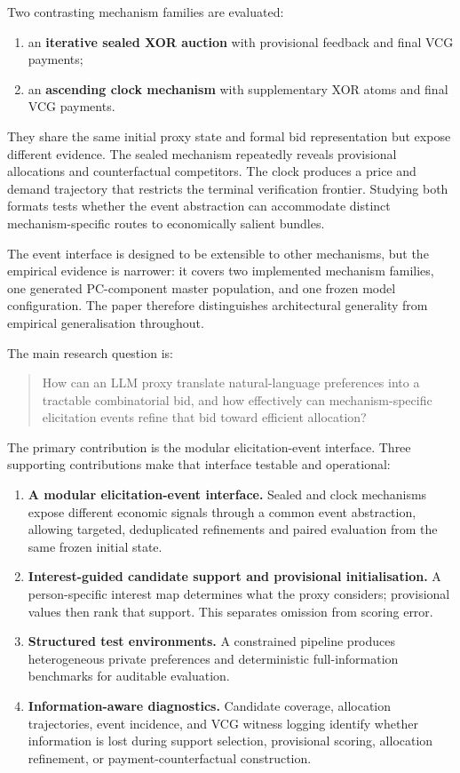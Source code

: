 Two contrasting mechanism families are evaluated:
\begin{enumerate}[leftmargin=*]
    \item an \textbf{iterative sealed XOR auction} with provisional feedback and final VCG payments;
    \item an \textbf{ascending clock mechanism} with supplementary XOR atoms and final VCG payments.
\end{enumerate}
They share the same initial proxy state and formal bid representation but
expose different evidence. The sealed mechanism repeatedly reveals provisional
allocations and counterfactual competitors. The clock produces a price and
demand trajectory that restricts the terminal verification frontier. Studying
both formats tests whether the event abstraction can accommodate distinct
mechanism-specific routes to economically salient bundles.

The event interface is designed to be extensible to other mechanisms, but
the empirical evidence is narrower: it covers two implemented mechanism
families, one generated PC-component master population, and one frozen model
configuration. The paper therefore distinguishes architectural generality
from empirical generalisation throughout.

The main research question is:
\begin{quote}
How can an LLM proxy translate natural-language preferences into a tractable
combinatorial bid, and how effectively can mechanism-specific elicitation
events refine that bid toward efficient allocation?
\end{quote}

The primary contribution is the modular elicitation-event interface. Three
supporting contributions make that interface testable and operational:
\begin{enumerate}[leftmargin=*]
    \item \textbf{A modular elicitation-event interface.} Sealed and clock mechanisms expose different economic signals through a common event abstraction, allowing targeted, deduplicated refinements and paired evaluation from the same frozen initial state.
    \item \textbf{Interest-guided candidate support and provisional initialisation.} A person-specific interest map determines what the proxy considers; provisional values then rank that support. This separates omission from scoring error.
    \item \textbf{Structured test environments.} A constrained pipeline produces heterogeneous private preferences and deterministic full-information benchmarks for auditable evaluation.
    \item \textbf{Information-aware diagnostics.} Candidate coverage, allocation trajectories, event incidence, and VCG witness logging identify whether information is lost during support selection, provisional scoring, allocation refinement, or payment-counterfactual construction.
\end{enumerate}

